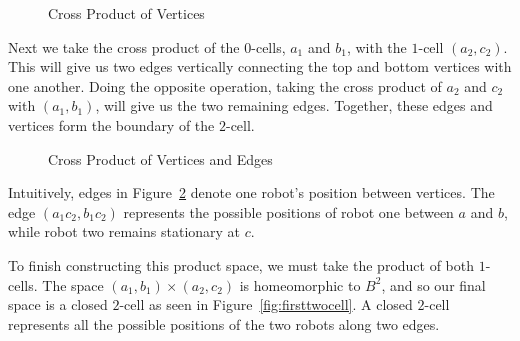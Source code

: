 \begin{figure}[h]
\caption{Cross Product of Vertices}\label{fig:vertexcross}
\centering
{}
\end{figure}

Next we take the cross product of the $0$-cells, $a_1$ and $b_1$, with the $1$-cell $(a_2,c_2)$. This will give us two edges vertically connecting the top and bottom vertices with one another. Doing the opposite operation, taking the cross product of $a_2$ and $c_2$ with $(a_1, b_1)$, will give us the two remaining edges. Together, these edges and vertices form the boundary of the $2$-cell.

\begin{figure}[h]
\caption{Cross Product of Vertices and Edges}\label{fig:crosswithedges}
\centering
{}
\hspace{.5in}
\end{figure}

Intuitively, edges in Figure~\ref{fig:crosswithedges} denote one robot's position between vertices. The edge $(a_1c_2, b_1c_2)$ represents the possible positions of robot one between $a$ and $b$, while robot two remains stationary at $c$.

To finish constructing this product space, we must take the product of both $1$-cells. The space $(a_1,b_1)\times (a_2, c_2)$ is homeomorphic to $B^2$, and so our final space is a closed $2$-cell as seen in Figure~\ref{fig:firsttwocell}. A closed $2$-cell represents all the possible positions of the two robots along two edges. 
 
